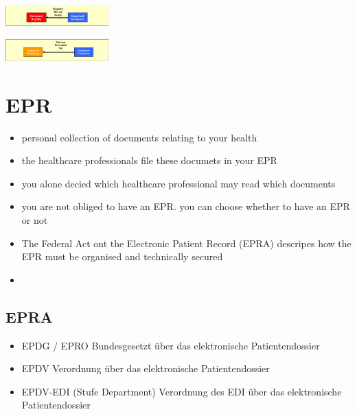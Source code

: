 \documentclass{report}
\newenvironment{Figure}
	{\par\medskip\noindent\minipage{\linewidth}}
	{\endminipage\par\medskip}
\theoremstyle{definition}
\theoremstyle{example}
\begin{document}
\begin{Figure}
   \centering
    \includegraphics[width=150px]{img/ITI18.png}
        \label{fig:Workflow from ITI-18}
\end{Figure}

\begin{Figure}
   \centering
    \includegraphics[width=150px]{img/ITI43.png}
        \label{fig:Workflow from ITI-43}
\end{Figure}

\chapter{EPR}
\begin{itemize}
   \item personal collection of documents relating to your health
   \item the healthcare professionals file these documets in your EPR
   \item you alone decied which healthcare professional may read which documents 
   \item you are not obliged to have an EPR. you can choose whether to have an EPR or not
   \item The Federal Act ont the Electronic Patient Record (EPRA) descripes how the EPR must be organised and technically secured
   \item 
\end{itemize}

\section{EPRA}
\begin{itemize}
   \item EPDG / EPRO
   \subitem Bundesgesetzt über das elektronische Patientendossier 
   \item EPDV
   \subitem Verordnung über das elektronische Patientendossier 
   \item EPDV-EDI (Stufe Department)
   \subitem Verordnung des EDI über das elektronische Patientendossier 
\end{itemize}
\end{document}
